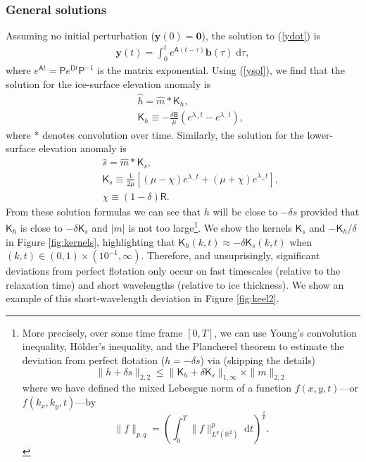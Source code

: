 \documentclass[paper=a4, fontsize=11pt]{article} %
\begin{document}
\subsubsection{General solutions}
Assuming no initial perturbation ($\pmb{y}(0)=\pmb{0}$), the solution to (\ref{ydot}) is
\begin{eqnarray}
\pmb{y}(t) = \int_0^t e^{\mathsf{A}(t-\tau)} \pmb{b}(\tau)\;\mathrm{d}\tau, \label{ysol}
\end{eqnarray}
where $e^{\mathsf{A}t} = \mathsf{P}e^{\mathsf{D}t}\mathsf{P}^{-1}$ is the matrix exponential.
Using (\ref{ysol}), we find that
the solution for the ice-surface elevation anomaly is
\begin{eqnarray}
&&\widehat{h} = \widehat{m} * {\mathsf{K}}_h \nonumber, \\
&&{\mathsf{K}}_h  \equiv  -\frac{\delta\mathsf{B}}{\mu}(e^{\lambda_+ t}-e^{\lambda_-t}), \label{hfsol}
\end{eqnarray}
where $*$ denotes convolution over time. Similarly, the solution for the lower-surface elevation anomaly is
\begin{eqnarray}
  &&\widehat{s} = \widehat{m} * {\mathsf{K}}_s\nonumber, \\
 &&{\mathsf{K}}_s  \equiv  \frac{1}{2\mu}[(\mu-\chi)e^{\lambda_- t}+(\mu+\chi)e^{\lambda_+t}],\nonumber \\
  &&\chi \equiv (1-\delta)\mathsf{R}. \label{sfsol}
\end{eqnarray}
From these solution formulas we can see that $h$ will be close to $-\delta s$ provided that
$\mathsf{K}_h$ is close to $-\delta \mathsf{K}_s$ and $|m|$ is not too large\footnote{
More precisely, over some time frame $[0,T]$, we can use Young's convolution inequality,
H\"{o}lder's inequality, and the Plancherel theorem to estimate the deviation from
perfect flotation ($h=-\delta s$) via (skipping the details)
\begin{equation*}
\|h+\delta s\|_{2,2} \leq \|\mathsf{K}_h + \delta \mathsf{K}_s\|_{1,\infty} \times \|m\|_{2,2}
\end{equation*}
where we have defined the mixed Lebesgue norm of a function $f(x,y,t)$---or $f(k_x,k_y,t)$---by
\begin{equation*}
\|f\|_{p,q} = \left(\int_0^T \|f\|_{L^q(\mathbb{R}^2)}^p \; \mathrm{d}t \right)^{\frac{1}{p}}.
\end{equation*}
}.
We show the kernels $\mathsf{K}_s$ and $-\mathsf{K}_h/\delta$ in Figure \ref{fig:kernels},
highlighting that $\mathsf{K}_h(k,t)\approx-\delta\mathsf{K}_s(k,t)$ when
$(k,t)\in(0,1)\times(10^{-1},\infty)$. Therefore, and unsuprisingly,
significant deviations from perfect flotation only occur on fast timescales (relative to the relaxation time)
and short wavelengths (relative to ice thickness). We show an example of this short-wavelength
deviation in Figure \ref{fig:keel2}.
\end{document}
